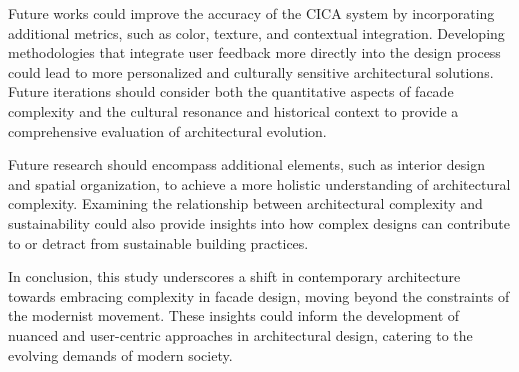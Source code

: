 Future works could improve the accuracy of the CICA system by incorporating additional metrics, such as color, texture, and contextual integration.
Developing methodologies that integrate user feedback more directly into the design process could lead to more personalized and culturally sensitive architectural solutions.
Future iterations should consider both the quantitative aspects of facade complexity and the cultural resonance and historical context to provide a comprehensive evaluation of architectural evolution.

Future research should encompass additional elements, such as interior design and spatial organization, to achieve a more holistic understanding of architectural complexity.
Examining the relationship between architectural complexity and sustainability could also provide insights into how complex designs can contribute to or detract from sustainable building practices.

In conclusion, this study underscores a shift in contemporary architecture towards embracing complexity in facade design, moving beyond the constraints of the modernist movement.
These insights could inform the development of nuanced and user-centric approaches in architectural design, catering to the evolving demands of modern society.


